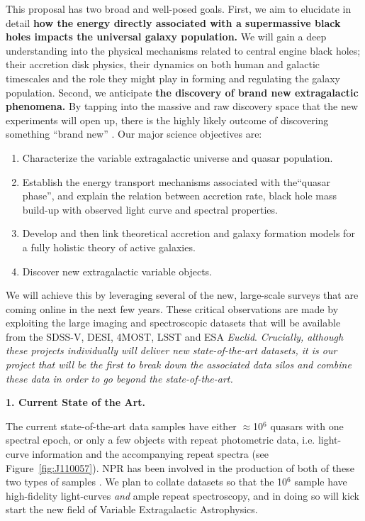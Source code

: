 \documentclass[oneside, a4paper, onecolumn, 11pt]{article}
\begin{document}
\smallskip
\smallskip
\noindent
This proposal has two broad and well-posed goals. First, we aim to
elucidate in detail {\bf how the energy directly associated with a
supermassive black holes impacts the universal galaxy population.} We
will gain a deep understanding into the physical mechanisms related to
central engine black holes; their accretion disk physics, their
dynamics on both human and galactic timescales and the role they might
play in forming and regulating the galaxy population.
Second, we anticipate {\bf the discovery of brand new extragalactic
phenomena.}  By tapping into the massive and raw discovery space that
the new experiments will open up, there is the highly likely outcome
of discovering something ``brand new'' \citep{Ivezic2008,
LSST_ScienceBook}.  Our major science objectives are:
\begin{enumerate}
\item Characterize the variable extragalactic universe and quasar population. 
\item Establish the energy transport mechanisms associated with the``quasar phase'', and explain the relation between accretion rate, black hole mass build-up with observed light curve and spectral properties. 
\item Develop and then link theoretical accretion and galaxy formation models for a fully holistic theory of active galaxies. 
\item Discover new extragalactic variable objects. 
\end{enumerate}

\smallskip
\smallskip
\noindent
We will achieve this by leveraging several of the new, large-scale
surveys that are coming online in the next few years. These critical
observations are made by exploiting the large imaging and
spectroscopic datasets that will be available from the SDSS-V, DESI,
4MOST, LSST and ESA {\it Euclid}. {\it Crucially, although these
projects individually will deliver new state-of-the-art datasets, it
is our project that will be the first to break down the associated
data silos and combine these data in order to go beyond the
state-of-the-art.}


\medskip
\medskip
\noindent
\large
{\bf{\textcolor{Cerulean}{1. Current State of the Art.}}}
\normalsize

\smallskip
\noindent
The current state-of-the-art data samples have either
$\approx$10$^{6}$ quasars with one spectral epoch, or only a few
objects with repeat photometric data, i.e. light-curve information and
the accompanying repeat spectra (see Figure~\ref{fig:J110057}).  NPR
has been involved in the production of both of these two types of
samples \citep{MacLeod2016, Paris2017}. We plan to collate datasets so
that the 10$^{6}$ sample have high-fidelity light-curves {\it and}
ample repeat spectroscopy, and in doing so will kick start the new
field of Variable Extragalactic Astrophysics.
\end{document}
